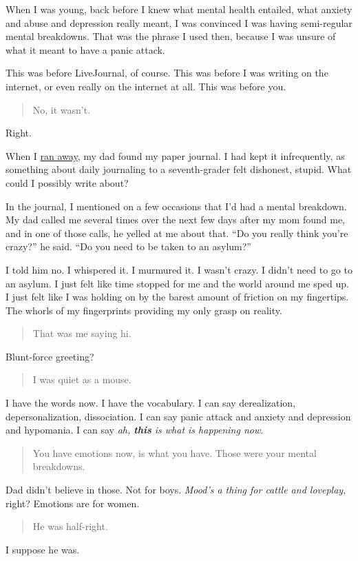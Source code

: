 When I was young, back before I knew what mental health entailed, what anxiety and abuse and depression really meant, I was convinced I was having semi-regular mental breakdowns. That was the phrase I used then, because I was unsure of what it meant to have a panic attack.

This was before LiveJournal, of course. This was before I was writing on the internet, or even really on the internet at all. This was before you.

\begin{quote}
No, it wasn't.
\end{quote}

Right.

When I \href{https://writing.drab-makyo.com/blog/running-away/}{ran away}, my dad found my paper journal. I had kept it infrequently, as something about daily journaling to a seventh-grader felt dishonest, stupid. What could I possibly write about?

In the journal, I mentioned on a few occasions that I'd had a mental breakdown. My dad called me several times over the next few days after my mom found me, and in one of those calls, he yelled at me about that. ``Do you really think you're crazy?'' he said. ``Do you need to be taken to an asylum?''

I told him no. I whispered it. I murmured it. I wasn't crazy. I didn't need to go to an asylum. I just felt like time stopped for me and the world around me sped up. I just felt like I was holding on by the barest amount of friction on my fingertips. The whorls of my fingerprints providing my only grasp on reality.

\begin{quote}
That was me saying hi.
\end{quote}

Blunt-force greeting?

\begin{quote}
I was quiet as a mouse.
\end{quote}

I have the words now. I have the vocabulary. I can say derealization, depersonalization, dissociation. I can say panic attack and anxiety and depression and hypomania. I can say \emph{ah, \textbf{this} is what is happening now}.

\begin{quote}
You have emotions now, is what you have. Those were your mental breakdowns.
\end{quote}

Dad didn't believe in those. Not for boys. \emph{Mood's a thing for cattle and loveplay}, right? Emotions are for women.

\begin{quote}
He was half-right.
\end{quote}

I suppose he was.
